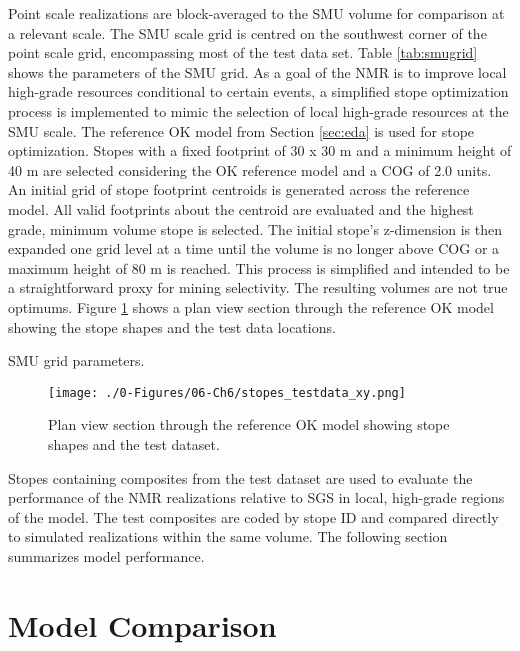 Point scale realizations are block-averaged to the \gls{SMU} volume for comparison at a relevant scale. The \gls{SMU} scale grid is centred on the southwest corner of the point scale grid, encompassing most of the test data set. Table \ref{tab:smugrid} shows the parameters of the \gls{SMU} grid. As a goal of the \gls{NMR} is to improve local high-grade resources conditional to certain events, a simplified stope optimization process is implemented to mimic the selection of local high-grade resources at the \gls{SMU} scale. The reference \gls{OK} model from Section \ref{sec:eda} is used for stope optimization. Stopes with a fixed footprint of 30 x 30 m and a minimum height of 40 m are selected considering the \gls{OK} reference model and a \gls{COG} of 2.0 units. An initial grid of stope footprint centroids is generated across the reference model. All valid footprints about the centroid are evaluated and the highest grade, minimum volume stope is selected. The initial stope's z-dimension is then expanded one grid level at a time until the volume is no longer above \gls{COG} or a maximum height of 80 m is reached. This process is simplified and intended to be a straightforward proxy for mining selectivity. The resulting volumes are not true optimums. Figure \ref{fig:stopes_testdata_xy} shows a plan view section through the reference \gls{OK} model showing the stope shapes and the test data locations.


\begin{table}[!htb]
    \centering
    \caption{\Gls{SMU} grid parameters.}
    \resizebox{0.9\width}{!}{}
    \label{tab:smugrid}
\end{table}

\begin{figure}[htb!]
    \centering
    \texttt{[image: ./0-Figures/06-Ch6/stopes\_testdata\_xy.png]}
    \caption{Plan view section through the reference \gls{OK} model showing stope shapes and the test dataset. }
    \label{fig:stopes_testdata_xy}
\end{figure}

Stopes containing composites from the test dataset are used to evaluate the performance of the \gls{NMR} realizations relative to \gls{SGS} in local, high-grade regions of the model. The test composites are coded by stope ID and compared directly to simulated realizations within the same volume. The following section summarizes model performance.

\FloatBarrier
\section{Model Comparison}
\label{sec:compare}

